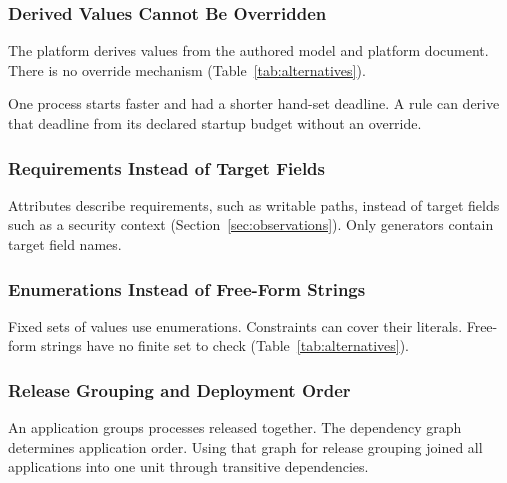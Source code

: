 \subsubsection{Derived Values Cannot Be Overridden}

The platform derives values from the authored model and platform document.
There is no override mechanism (Table~\ref{tab:alternatives}).

One process starts faster and had a shorter hand-set deadline. A rule can
derive that deadline from its declared startup budget without an override.

\subsubsection{Requirements Instead of Target Fields}
\label{sec:naming}

Attributes describe requirements, such as writable paths, instead of target
fields such as a security context (Section~\ref{sec:observations}). Only
generators contain target field names.

\subsubsection{Enumerations Instead of Free-Form Strings}
\label{sec:enumdecision}

Fixed sets of values use enumerations. Constraints can cover their literals.
Free-form strings have no finite set to check (Table~\ref{tab:alternatives}).

\subsubsection{Release Grouping and Deployment Order}

An application groups processes released together. The dependency graph
determines application order. Using that graph for release grouping joined all
applications into one unit through transitive dependencies.
